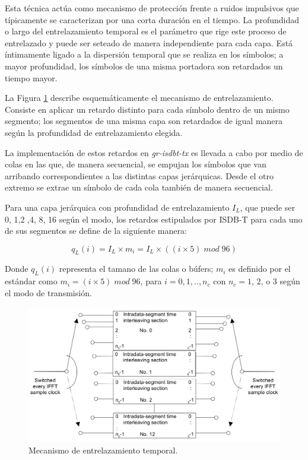 Esta t\'ecnica act\'ua como mecanismo de protecci\'on frente a ruidos impulsivos que t\'ipicamente se caracterizan por una corta duraci\'on en el tiempo. La profundidad o largo del entrelazamiento temporal es el par\'ametro que rige este proceso de entrelazado y puede ser seteado de manera independiente para cada capa. Est\'a \'intimamente ligado a la dispersi\'on temporal que se realiza en los s\'imbolos; a mayor profundidad, los s\'imbolos de una misma portadora son retardados un tiempo mayor.

La Figura \ref{f:entrelazamiento_temporal} describe esquem\'aticamente el mecanismo de entrelazamiento. Consiste en aplicar un retardo distinto para cada s\'imbolo dentro de un mismo segmento; los segmentos de una misma capa son retardados de igual manera seg\'un la profundidad de entrelazamiento elegida. 

La implementaci\'on de estos retardos en \textit{gr-isdbt-tx} es llevada a cabo por medio de colas en las que, de manera secuencial, se empujan los s\'imbolos que van arribando correspondientes a las distintas capas jer\'arquicas. Desde el otro extremo se extrae un s\'imbolo de cada cola tambi\'en de manera secuencial. 

Para una capa jer\'arquica con profundidad de entrelazamiento $I_L$, que puede ser 0, 1,2 ,4, 8, 16 seg\'un el modo, los retardos estipulados por ISDB-T para cada uno de sus segmentos se define de la siguiente manera:

\begin{equation}
q_L(i) = I_L \times m_i = I_L \times ((i \times 5) \; mod \; 96)
\end{equation}

Donde $q_L(i)$ representa el tamano de las colas o búfers; $m_i$ es definido por el est\'andar como $m_i = (i \times 5) \; mod \; 96$, para $i = 0, 1,..,n_c$ con $n_c = 1$, $2$, o $3$ seg\'un el modo de transmisi\'on. 

\begin{figure}[!h]
	\centering
	\includegraphics[scale=0.4]{figuras/cap05/entrelazamiento_temporal}
	\caption{\label{f:entrelazamiento_temporal} Mecanismo de entrelazamiento temporal.}
\end{figure}


